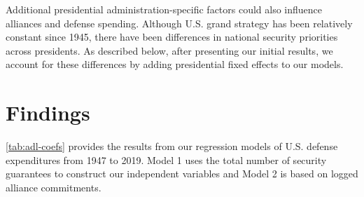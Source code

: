 \documentclass[12pt,hidelinks]{article}
\begin{document}
Additional presidential administration-specific factors could also influence alliances and defense spending. Although U.S. grand strategy has been relatively constant since 1945, there have been differences in national security priorities across presidents. As described below, after presenting our initial results, we account for these differences by adding presidential fixed effects to our models. 





\section*{Findings}


\autoref{tab:adl-coefs} provides the results from our regression models of U.S. defense expenditures from 1947 to 2019. 
Model 1 uses the total number of security guarantees to construct our independent variables and Model 2 is based on logged alliance commitments. 
\end{document}

